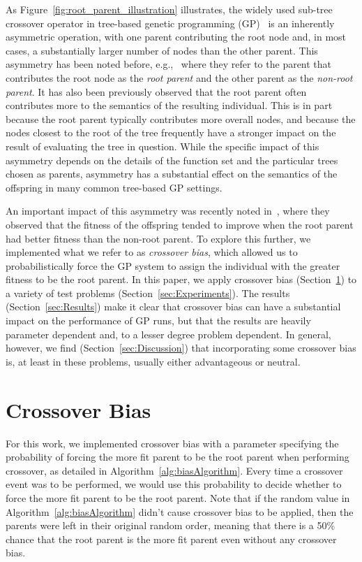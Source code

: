 \documentclass{sig-alternate}
\begin{document}
As Figure~\ref{fig:root_parent_illustration} illustrates, the widely used sub-tree crossover operator in tree-based
genetic programming (GP)~\cite{poli08:fieldguide} is an inherently asymmetric operation, with one parent contributing
the root node and, in most cases, a substantially larger number of nodes than the other parent. This asymmetry has been
noted before, e.g.,~\cite{mcphee1999analysis} where they refer to the parent that contributes the root node as the
\emph{root parent} and the other parent as the \emph{non-root parent}. It has also been previously observed
\cite{burlacu2013visualization, McPheeDonatucciDramdahl:2014,  McPhee:2008:SBB:1792694.1792707} that the root parent
often contributes more to the semantics of the resulting individual. This is in part because the root parent typically
contributes more overall nodes, and because the nodes closest to the root of the tree frequently have a stronger impact
on the result of evaluating the tree in question. While the specific impact of this asymmetry depends on the details of
the function set and the particular trees chosen as parents,  asymmetry has a substantial effect on the semantics of
the offspring in many common tree-based GP settings. 

An important impact of this asymmetry was recently noted in~\cite{McPheeDonatucciDramdahl:2014}, where they observed
that the fitness of the offspring tended to improve when the root parent had better fitness than the non-root parent.
To explore this further, we implemented what we refer to as \emph{crossover bias}, which allowed us to
probabilistically force the GP system to assign the individual with the greater fitness to be the root parent. In this
paper, we apply crossover bias (Section~\ref{sec:XObias}) to a variety of test problems
(Section~\ref{sec:Experiments}). The results (Section~\ref{sec:Results}) make it clear that crossover bias can have a
substantial impact on the performance of GP runs, but that the results are heavily parameter dependent and, to a lesser
degree problem dependent. In general, however, we find (Section~\ref{sec:Discussion}) that incorporating some crossover
bias is, at least in these problems, usually either advantageous or neutral. 

\section{Crossover Bias} \label{sec:XObias}

For this work, we implemented crossover bias with a parameter specifying the probability of forcing the more fit parent
to be the root parent when performing crossover, as detailed in Algorithm~\ref{alg:biasAlgorithm}. Every time a
crossover event was to be performed, we would use this probability to decide whether to force the more fit parent to be
the root parent. Note that if the random value in Algorithm~\ref{alg:biasAlgorithm} didn't cause crossover bias to be
applied, then the parents were left in their original random order, meaning that there is a 50\% chance that the root
parent is the more fit parent even without any crossover bias.
\end{document}
